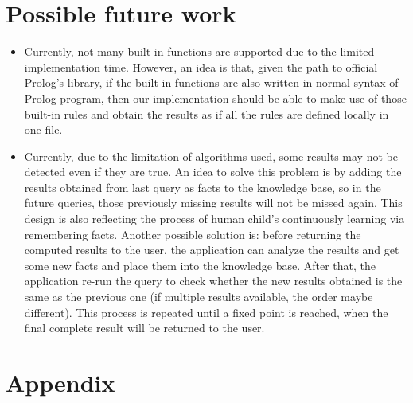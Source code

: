 \documentclass[11pt,a4paper]{report}
\begin{document}
\section*{Possible future work}
\begin{itemize}
	\item Currently, not many built-in functions are supported due to the limited implementation time. However, an idea is that, given the path to official Prolog's library, if the built-in functions are also written in normal syntax of Prolog program, then our implementation should be able to make use of those built-in rules and obtain the results as if all the rules are defined locally in one file.
	
	\item Currently, due to the limitation of algorithms used, some results may not be detected even if they are true. An idea to solve this problem is by adding the results obtained from last query as facts to the knowledge base, so in the future queries, those previously missing results will not be missed again. This design is also reflecting the process of  human child's continuously learning via remembering facts. Another possible solution is: before returning the computed results to the user, the application can analyze the results and get some new facts and place them into the knowledge base. After that, the application re-run the query to check whether the new results obtained is the same as the previous one (if multiple results available, the order maybe different). This process is repeated until a fixed point is reached, when the final complete result will be returned to the user. 
\end{itemize}





\section*{Appendix}

\end{document}
